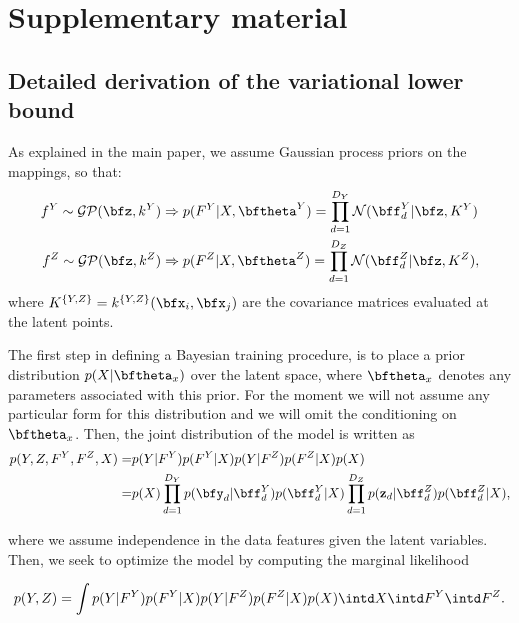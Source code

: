 


\onecolumn


\section{Supplementary material}

\subsection{Detailed derivation of the variational lower bound}

\par As explained in the main paper, we assume Gaussian process priors on the mappings, so that:
\begin{align}
f^Y \sim \mathcal{GP}(\bfz, k^Y) & \Rightarrow p(F^Y|X, \bftheta^Y) = \prod_{d=1}^{D_Y} \mathcal{N}(\bff^Y_d | \bfz, K^Y) \nonumber \\
f^Z \sim \mathcal{GP}(\bfz, k^Z) & \Rightarrow p(F^Z|X, \bftheta^Z) = \prod_{d=1}^{D_Z} \mathcal{N}(\bff^Z_d | \bfz, K^Z) \label{GPpriorsSuppl} ,
\end{align}
where $K^{\{Y,Z\}}  = k^{\{Y,Z\}}(\bfx_i, \bfx_j)$ are the covariance matrices evaluated at the latent points.


\par The first step in defining a Bayesian training procedure, is to place a prior distribution $p(X|\bftheta_x)$ over the latent space,
where $\bftheta_x$ denotes any parameters associated with this prior.
For the moment we will not assume any particular form for this distribution and we will omit the conditioning on $\bftheta_x$. Then, the
joint distribution of the model is written as
\begin{align}
p(Y,Z,F^Y,F^Z, X) = & p(Y|F^Y) p(F^Y|X) p(Y|F^Z) p(F^Z|X) p(X) \nonumber \\
		  = & p(X) \prod_{d=1}^{D_Y}  p(\bfy_d | \bff^Y_d) p(\bff^Y_d | X)
			   \prod_{d=1}^{D_Z}  p(\mathbf{z}_d | \bff^Z_d) p(\bff^Z_d | X) , \label{jointSuppl}
\end{align}

\noindent where we assume independence in the data features given the latent variables.
Then, we seek to optimize the model by computing the marginal likelihood

\begin{equation}
\label{marginalLikelihood}
p(Y,Z) =  \int p( Y | F^Y ) p(F^Y | X ) p( Y | F^Z ) p(F^Z | X ) p(X) \intd  X \intd F^Y \intd F^Z.
\end{equation}
 
